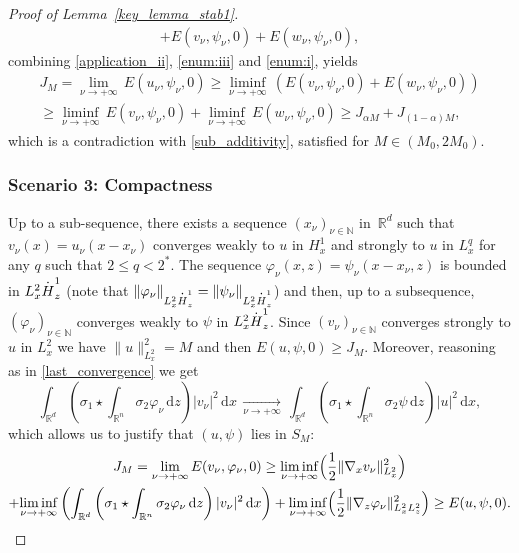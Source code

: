 \documentclass[11pt]{article}
\DeclareRobustCommand{\accentset}[2]{\overset{#1}{#2}}
\theoremstyle{definition}
\newcommand*{\overbigdot}[1]{%
\accentset{\mbox{\large\bfseries .}}{#1}}
\newenvironment{ProofOf}[1]{\begin{proof}[Proof of #1]}{\end{proof}}
\newcommand{\R}{\mathbb{R}}
\newcommand{\ud}{\, {\mathrm{d}}}
\begin{document}
\begin{ProofOf}{Lemma~\ref{key_lemma_stab1}}
\begin{multline*}
+E(v_{\nu},\psi_{\nu},0)+E(w_{\nu},\psi_{\nu},0),
\end{multline*}
\egroup
combining \eqref{application_ii}, \eqref{enum:iii} and \eqref{enum:i}, yields
\begin{multline*}
J_{M}=\underset{\nu\to +\infty}{\lim}\,E(u_{\nu},\psi_{\nu},0)\geq\underset{\nu\to+\infty}{\liminf}\,\left(E(v_{\nu},\psi_{\nu},0)+E(w_{\nu},\psi_{\nu},0)\right)\\
\geq\underset{\nu\to+\infty}{\liminf}\,E(v_{\nu},\psi_{\nu},0)+\underset{\nu\to+\infty}{\liminf}\,E(w_{\nu},\psi_{\nu},0)\geq J_{\alpha M}+J_{(1-\alpha)M},
\end{multline*}
which is a contradiction with \eqref{sub_additivity}, satisfied for $M\in (M_0,2M_0)$.

\subsubsection*{Scenario 3: Compactness} Up to a sub-sequence, there exists a sequence $(x_{\nu})_{\nu\in\mathbb N}$ in~$\R^{d}$ such that $v_{\nu}(x)=u_{\nu}(x-x_{\nu})$ converges weakly to $u$ in $H_{x}^{1}$ and strongly to $u$ in $L_{x}^{q}$ for any $q$ such that $2\leq q<2^{*}$. The sequence $\varphi_{\nu}(x,z)=\psi_{\nu}(x-x_{\nu},z)$ is bounded in $L_{x}^{2}\overbigdot{H}_{z}^{1}$ (note that $\|\varphi_{\nu}\|_{L_{x}^{2}\overbigdot{H}_{z}^{1}}=\|\psi_{\nu}\|_{L_{x}^{2}\overbigdot{H}_{z}^{1}}$) and then, up to a subsequence, $(\varphi_{\nu})_{\nu\in\mathbb N}$ converges weakly to $\psi$ in $L_{x}^{2}\overbigdot{H}_{z}^{1}$. Since $(v_{\nu})_{\nu\in\mathbb N}$ converges strongly to $u$ in $L_{x}^{2}$ we have $\|u\|_{L_{x}^{2}}^{2}=M$ and then $E(u,\psi,0)\geq J_{M}$. Moreover, reasoning as in \eqref{last_convergence} we get
\begin{equation}\label{cv1}
\int_{\R^{d}}\left(\sigma_{1}\star\int_{\R^{n}}\sigma_{2}\varphi_{\nu}\ud z\right)|v_{\nu}|^{2}\ud x\,\underset{\nu\to+\infty}{\to}\,\int_{\R^{d}}\left(\sigma_{1}\star\int_{\R^{n}}\sigma_{2}\psi\ud z\right)|u|^{2}\ud x,
\end{equation}
which allows us to justify that $(u,\psi)$ lies in $S_{M}$:
\bgroup
{}
\begin{multline*}
J_{M}=\underset{\nu\to+\infty}{\lim}\,E(v_{\nu},\varphi_{\nu},0)\geq\underset{\nu\to+\infty}{\liminf}\Bigl(\frac{1}{2}\|\nabla_{x}v_{\nu}\|_{L_{x}^{2}}^{2}\Bigr)\\
+\underset{\nu\to +\infty}{\liminf}\left(\int_{\R^{d}}\left(\sigma_{1}\star\int_{\R^{n}}\sigma_{2}\varphi_{\nu}\ud z\right)|v_{\nu}|^{2}\ud x\right)+\underset{\nu\to+\infty}{\liminf}\Bigl(\frac{1}{2}\|\nabla_{z}\varphi_{\nu}\|_{L_{x}^{2}L_{z}^{2}}^{2}\Bigr)\geq E(u,\psi,0).

\end{multline*}
\end{ProofOf}
\end{document}
